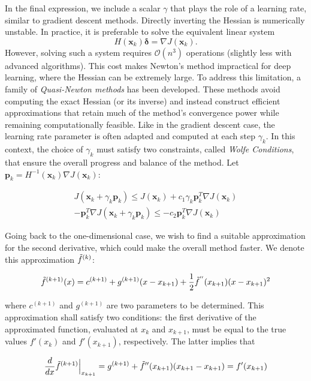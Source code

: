 \documentclass{article}
\numberwithin{equation}{subsection}
\begin{document}
In the final expression, we include a scalar $\gamma$ that plays the role of a learning rate, similar to gradient descent methods. Directly inverting the Hessian is numerically unstable. In practice, it is preferable to solve the equivalent linear system
\[
    H(\mathbf{x}_k)\boldsymbol{\delta} = \nabla J(\mathbf{x}_k).
\]
However, solving such a system requires $\mathcal{O}(n^3)$ operations (slightly less with advanced algorithms). This cost makes Newton’s method impractical for deep learning, where the Hessian can be extremely large. To address this limitation, a family of \emph{Quasi-Newton methods} has been developed. These methods avoid computing the exact Hessian (or its inverse) and instead construct efficient approximations that retain much of the method’s convergence power while remaining computationally feasible. Like in the gradient descent case, the learning rate parameter is often adapted and computed at each step $\gamma_k$. In this context, the choice of $\gamma_k$ must satisfy two constraints, called \textit{Wolfe Conditions}, that ensure the overall progress and balance of the method. Let $\textbf{p}_k = H^{-1}(\textbf{x}_k)\nabla J(\textbf{x}_k)$:

\begin{gather*}
    J(\textbf{x}_k + \gamma_k \textbf{p}_k) \leq J(\textbf{x}_k) + c_1 \gamma_k \textbf{p}_k^T \nabla J(\textbf{x}_k) \\
    -\textbf{p}_k^T \nabla J(\textbf{x}_k+\gamma_k \textbf{p}_k) \leq -c_2 \textbf{p}_k^T \nabla J(\textbf{x}_k)
\end{gather*}

Going back to the one-dimensional case, we wish to find a suitable approximation for the second derivative, which could make the overall method faster. We denote this approximation $\Tilde{f}^{(k)}$:

\begin{equation*}
    \Tilde{f}^{(k+1)}(x) = c^{(k+1)} + g^{(k+1)}(x - x_{k+1}) + \frac{1}{2} \Tilde{f}^{''}(x_{k+1}) (x-x_{k+1})^2 
\end{equation*}

where $c^{(k+1)}$ and $g^{(k+1)}$ are two parameters to be determined. This approximation shall satisfy two conditions: the first derivative of the approximated function, evaluated at $x_k$ and $x_{k+1}$, must be equal to the true values $f'(x_k)$ and $f'(x_{k+1})$, respectively. The latter implies that

\begin{gather*}
    \frac{d}{dx}\Tilde{f}^{(k+1)} \Big\vert_{x_{k+1}} = g^{(k+1)} + \Tilde{f}''(x_{k+1}) ( x_{k+1} - x_{k+1}) = f'(x_{k+1})
\end{gather*}
\end{document}

